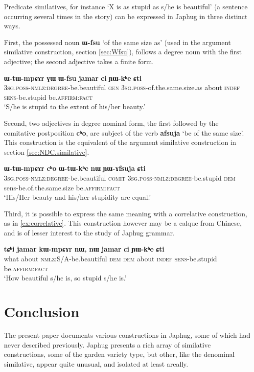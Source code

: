 \documentclass[oneside,a4paper,11pt]{article}
\newcommand{\ipa}[1]{{\phon\textbf{#1}}} %
\newcommand{\forme}[2]{\ipa{#1} `#2'}
\begin{document}
Predicate similatives, for instance `X is as stupid as s/he is beautiful' (a sentence occurring several times in the story) can be expressed in Japhug in three distinct ways.

First, the possessed noun \forme{ɯ-fsu}{of the same size as} (used in the argument similative construction, section \ref{sec:Wfsu}), follows a degree noun with the first adjective; the second adjective takes a finite form.

\begin{exe}
\ex 
\gll 
\ipa{ɯ-tɯ-mpɕɤr} \ipa{ɣɯ} 	\ipa{ɯ-fsu} 	\ipa{jamar} 	\ipa{ci} 	\ipa{ɲɯ-kʰe} 	\ipa{ɕti} \\
\textsc{3sg.poss-nmlz:degree}-be.beautiful \textsc{gen} \textsc{3sg.poss}-of.the.same.size.as about \textsc{indef} \textsc{sens}-be.stupid be.\textsc{affirm:fact} \\
\glt `S/he is stupid to the extent of his/her beauty.'
\end{exe}

Second, two adjectives in degree nominal form, the first followed by the comitative postposition \ipa{cʰo}, are subject of the verb \forme{afsuja}{be of the same size}. This construction is the equivalent of the argument similative construction in section \ref{sec:NDC.similative}.

\begin{exe}
\ex \label{ex:YAfsuja}
\gll 
\ipa{ɯ-tɯ-mpɕɤr} 	\ipa{cʰo} 	\ipa{ɯ-tɯ-kʰe} 	\ipa{nɯ} 	\ipa{ɲɯ-ɤfsuja} 	\ipa{ɕti} \\
\textsc{3sg.poss-nmlz:degree}-be.beautiful \textsc{comit} \textsc{3sg.poss-nmlz:degree}-be.stupid \textsc{dem} sens-be.of.the.same.size be.\textsc{affirm:fact} \\
\glt `His/Her beauty and his/her stupidity are equal.'
\end{exe}

Third, it is possible to express the same meaning with a correlative construction, as in \ref{ex:correlative}. This construction however may be a calque from Chinese, and is of lesser interest to the study of Japhug grammar.

\begin{exe}
\ex \label{ex:correlative}
\gll 
\ipa{tɕʰi} 	\ipa{jamar} 	\ipa{kɯ-mpɕɤr} 	\ipa{nɯ,} 	\ipa{nɯ} 	\ipa{jamar} 	\ipa{ci} 	\ipa{ɲɯ-kʰe} 	\ipa{ɕti} \\
what about \textsc{nmlz}:S/A-be.beautiful \textsc{dem} \textsc{dem} about \textsc{indef} \textsc{sens}-be.stupid be.\textsc{affirm:fact} \\
\glt `How beautiful s/he is, so stupid s/he is.'
\end{exe}

\section*{Conclusion}
The present paper documents various constructions in Japhug, some of which had never described previously. Japhug presents a rich array of similative constructions, some of the garden variety type, but other, like the denominal similative, appear quite unusual, and isolated at least areally.



\end{document}
